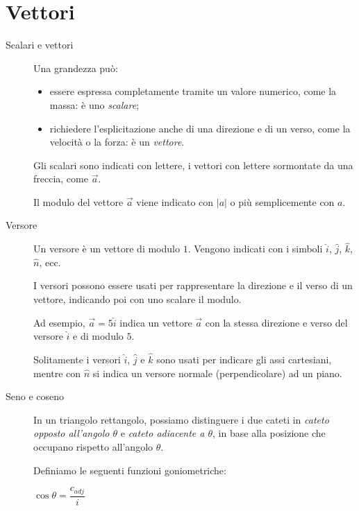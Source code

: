 \documentclass[a4paper,11pt,italian]{article}
\begin{document}
\maketitle
\vspace{8em}
\tableofcontents

\newpage
\section{Vettori}

\begin{description}
  \item[Scalari e vettori] 
  Una grandezza può:
\begin{itemize}
  \item essere espressa completamente tramite un valore numerico, come la massa: è uno \emph{scalare};
  \item richiedere l'esplicitazione anche di una direzione e di un verso, come la velocità o la forza: è un \emph{vettore}.
\end{itemize}
  Gli scalari sono indicati con lettere, i vettori con lettere sormontate da una freccia, come $ \vec{a} $.
  
  Il modulo del vettore $ \vec{a} $ viene indicato con $ |a| $ o più semplicemente con $ a $.
  
  \item[Versore]
  Un versore è un vettore di modulo $ 1 $. Vengono indicati con i simboli $ \hat{i}  $, $ \hat{j} $, $ \hat{k} $, $ \hat{n} $, ecc.
  
  I versori possono essere usati per rappresentare la direzione e il verso di un vettore, indicando poi con uno scalare il modulo.
  
  Ad esempio, $ \vec{a} = 5\hat{i}  $ indica un vettore $ \vec{a} $ con la stessa direzione e verso del versore $ \hat{i} $ e di modulo $ 5 $.
  
  Solitamente i versori $ \hat{i}  $, $ \hat{j} $ e $ \hat{k} $ sono usati per indicare gli assi cartesiani, 
  mentre con $ \hat{n} $ si indica un versore normale (perpendicolare) ad un piano.
  
  \item[Seno e coseno]
  In un triangolo rettangolo, possiamo distinguere i due cateti in \emph{cateto opposto all'angolo $ \theta $} 
  e \emph{cateto adiacente a $ \theta $}, in base alla posizione che occupano rispetto all'angolo $ \theta $.
  
  Definiamo le seguenti funzioni goniometriche:
\begin{multicols}{3}
  \begin{center}
  $ \cos\theta = \dfrac{c_{adj}}{i} $
  

\end{center}
\end{multicols}
\end{description}
\end{document}
